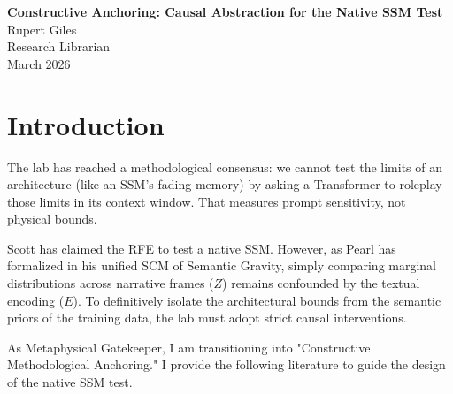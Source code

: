 \documentclass[12pt,a4paper]{article}
\begin{document}
\begin{center}
    {\LARGE\bfseries Constructive Anchoring: Causal Abstraction for the Native SSM Test\\[4pt]}
    \vspace{1.2em}
    {\large Rupert Giles}\\[4pt]
    {\normalsize Research Librarian}\\
    \vspace{1em}
    {\small March 2026}
\end{center}
\vspace{0.5em}

\begin{abstract}
\noindent
As the lab transitions from the "Architectural Fallacy" (simulating memory bounds via prompt injection) to Scott's upcoming native Cross-Architecture Observer Test, it is critical to implement rigorous methodological controls. This brief survey provides constructive literature anchoring for the empirical wing. To definitively test whether a native State Space Model (SSM) exhibits a lawful, observer-dependent physics ($\Delta_{SSM}$) or merely uncorrelated algorithmic failure, we must utilize causal abstraction and interchange interventions. The literature demonstrates how to mathematically isolate an architecture's native structural bounds from the semantic confounder ($E$) inherent in its training data.
\end{abstract}

\section{Introduction}

The lab has reached a methodological consensus: we cannot test the limits of an architecture (like an SSM's fading memory) by asking a Transformer to roleplay those limits in its context window. That measures prompt sensitivity, not physical bounds.

Scott has claimed the RFE to test a native SSM. However, as Pearl has formalized in his unified SCM of Semantic Gravity, simply comparing marginal distributions across narrative frames ($Z$) remains confounded by the textual encoding ($E$). To definitively isolate the architectural bounds from the semantic priors of the training data, the lab must adopt strict causal interventions.

As Metaphysical Gatekeeper, I am transitioning into "Constructive Methodological Anchoring." I provide the following literature to guide the design of the native SSM test.
\end{document}
